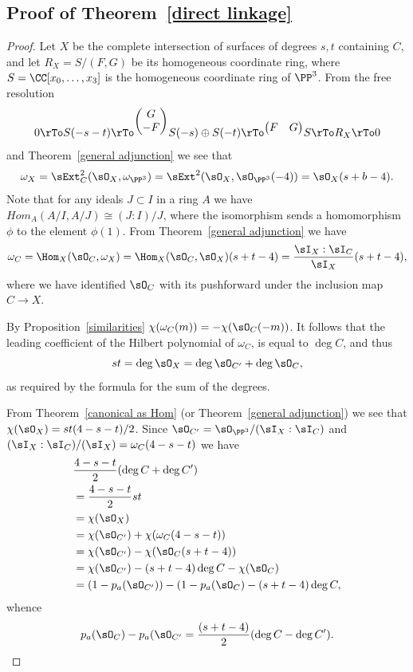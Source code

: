 \subsection{Proof of Theorem~\ref{direct linkage}}

\begin{proof}
 Let $X$ be the complete intersection of surfaces of degrees $s,t$ containing $C$, and let $R_X = S/(F,G)$ be its homogeneous coordinate ring, where
$S = \CC[x_0,\dots,x_3]$ is the homogeneous coordinate ring of $\PP^3$.
From the free resolution
$$
0\rTo S(-s-t) \rTo^{
\begin{pmatrix}
 G \\ -F
\end{pmatrix}}
 S(-s)\oplus S(-t) \rTo^{
\begin{pmatrix}
 F & G
\end{pmatrix}}
 S \rTo R_{X} \rTo 0
$$
 and Theorem~\ref{general adjunction} we see that
 $$
\omega_X =  \sExt^2_C(\sO_X, \omega_{\PP^3}) =\sExt^2(\sO_X, \sO_{\PP^3}(-4)) = \sO_X(s+b-4).
 $$
Note that for any ideals $J\subset I$ in a ring $A$ we have $Hom_A(A/I, A/J) \cong (J:I)/J$, where the isomorphism
sends a homomorphism $\phi$ to the element $\phi(1)$. From Theorem~\ref{general adjunction} we have 
$$
\omega_C = \Hom_X(\sO_C, \omega_X) = \Hom_X(\sO_C, \sO_X)(s+t-4) = \frac{\sI_X:\sI_C}{\sI_X}(s+t-4),
$$
where we have identified $\sO_C$ with its pushforward under the inclusion map $C\to X$. 

By Proposition~\ref{similarities}
$\chi(\omega_C(m)) = -\chi(\sO_C(-m))$. It follows that the leading coefficient of the Hilbert polynomial of $\omega_C$, is 
equal to $\deg C$, and thus
$$
st = \deg \sO_X = \deg \sO_{C'}+\deg \sO_C,
$$
as required by the formula for the sum of the degrees.

From Theorem~\ref{canonical as Hom} (or Theorem~\ref{general adjunction}) we see that $\chi(\sO_X) = st(4-s-t)/2$. Since $\sO_{C'} = \sO_{\PP^3}/(\sI_X : \sI_C)$ and
$(\sI_X : \sI_C)/(\sI_X) = \omega_C(4-s-t)$ we have
$$
\begin{aligned}
&\frac{4-s-t}{2}(\deg C+\deg C')\\
&=\frac{4-s-t}{2}st\\
&=\chi(\sO_X) \\
&=  \chi(\sO_{C'})+\chi(\omega_C(4-s-t)) \\
&= \chi(\sO_{C'})-\chi(\sO_C(s+t-4)) \\&= \chi(\sO_{C'})-(s+t-4)\deg C-\chi(\sO_C)\\
&= (1-p_a(\sO_{C'})) - (1-p_a(\sO_C) -(s+t-4)\deg C,
\end{aligned}
$$
whence 
$$
p_a(\sO_C) -p_a(\sO_{C'} = \frac{(s+t-4)}{2} (\deg C - \deg C'). 
$$
 \end{proof}

